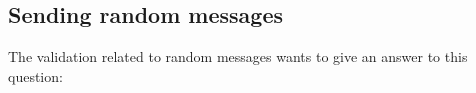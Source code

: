 \subsection{Sending random messages}
%
%
%
%
The validation related to random messages wants to give an answer to this question: 

